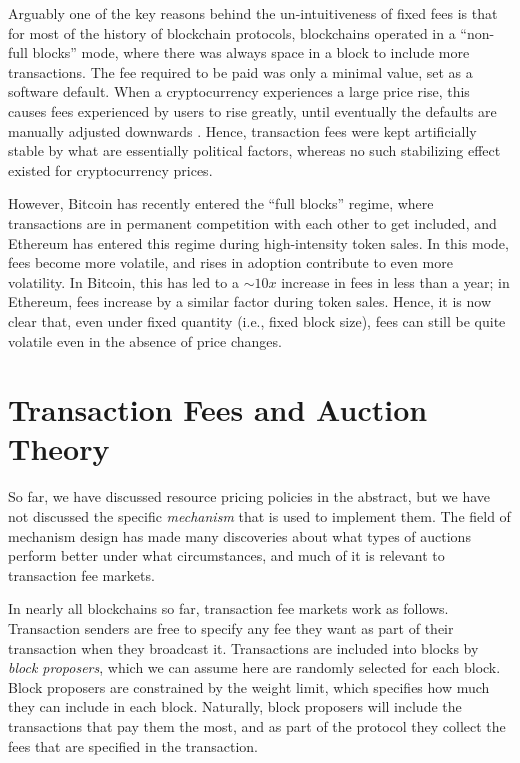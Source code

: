 \documentclass[12pt, final]{article}
\begin{document}
Arguably one of the key reasons behind the un-intuitiveness of fixed fees is that for most of the history of blockchain protocols, blockchains operated in a ``non-full blocks'' mode, where there was always space in a block to include more transactions. The fee required to be paid was only a minimal value, set as a software default. When a cryptocurrency experiences a large price rise, this causes fees experienced by users to rise greatly, until eventually the defaults are manually adjusted downwards \cite{coindesk-btc-txn-fee, reddit-rec-miners, vitalik-twitter1}.  Hence, transaction fees were kept artificially stable by what are essentially political factors, whereas no such stabilizing effect existed for cryptocurrency prices.

However, Bitcoin has recently entered the ``full blocks'' regime, where transactions are in permanent competition with each other to get included, and Ethereum has entered this regime during high-intensity token sales\cite{braveICO}. In this mode, fees become more volatile, and rises in adoption contribute to even more volatility. In Bitcoin, this has led to a $\sim 10x$ increase in fees in less than a year; in Ethereum, fees increase by a similar factor during token sales. Hence, it is now clear that, even under fixed quantity (i.e., fixed block size), fees can still be quite volatile even in the absence of price changes.

\section{Transaction Fees and Auction Theory}

So far, we have discussed resource pricing policies in the abstract, but we have not discussed the specific \emph{mechanism} that is used to implement them. The field of mechanism design has made many discoveries about what types of auctions perform better under what circumstances, and much of it is relevant to transaction fee markets.

In nearly all blockchains so far, transaction fee markets work as follows. Transaction senders are free to specify any fee they want as part of their transaction when they broadcast it. Transactions are included into blocks by \emph{block proposers}, which we can assume here are randomly selected for each block. Block proposers are constrained by the weight limit, which specifies how much they can include in each block. Naturally, block proposers will include the transactions that pay them the most, and as part of the protocol they collect the fees that are specified in the transaction.
\end{document}

